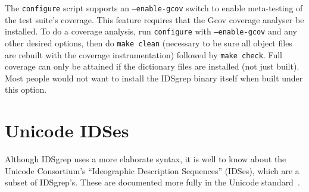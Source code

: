 \documentclass[twocolumn]{report}
\begin{document}
The \texttt{configure} script supports an \texttt{--enable-gcov} switch to
enable meta-testing of the test suite's coverage.  This feature requires
that the Gcov coverage analyser be installed.  To do a coverage analysis,
run \texttt{configure} with \texttt{--enable-gcov} and any other desired
options, then do \texttt{make clean} (necessary to be sure all object files
are rebuilt with the coverage instrumentation) followed by \texttt{make
check}.  Full coverage can only be attained if the dictionary files are
installed (not just built).  Most people would not want to install the
IDSgrep binary itself when built under this option.


\section{Unicode IDSes}

Although IDSgrep uses a more elaborate syntax, it is well to know
about the Unicode Consortium's ``Ideographic Description Sequences''
(IDSes), which are a subset of IDSgrep's.  These are documented
more fully in the Unicode standard~\cite{Unicode:IDS}.
\end{document}

